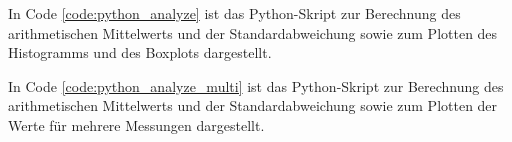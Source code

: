 \documentclass[11pt,a4paper,hidelinks]{article}
\begin{document}
In Code \ref{code:python_analyze} ist das Python-Skript zur Berechnung des arithmetischen Mittelwerts und der
Standardabweichung sowie zum Plotten des Histogramms und des Boxplots dargestellt.



In Code \ref{code:python_analyze_multi} ist das Python-Skript zur Berechnung des arithmetischen Mittelwerts und der
Standardabweichung sowie zum Plotten der Werte für mehrere Messungen dargestellt.


\pagebreak

\end{document}
